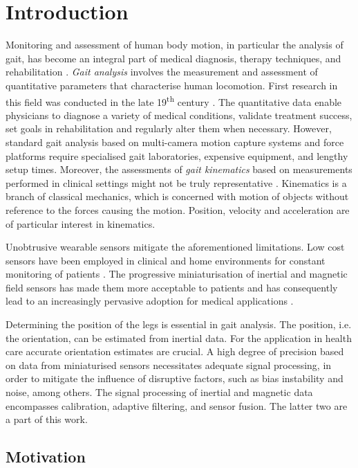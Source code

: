\chapter{Introduction}
\label{ch:Introduction}

Monitoring and assessment of human body motion, in particular the analysis of gait, has become an integral part of medical diagnosis, therapy techniques, and rehabilitation \cite{tao_gait_2012}. \emph{Gait analysis} involves the measurement and assessment of quantitative parameters that characterise human locomotion. First research in this field was conducted in the late 19\textsuperscript{th} century \cite{tao_gait_2012}. The quantitative data enable physicians to diagnose a variety of medical conditions, validate treatment success, set goals in rehabilitation and regularly alter them when necessary. However, standard gait analysis based on multi-camera motion capture systems and force platforms require specialised gait laboratories, expensive equipment, and lengthy setup times. Moreover, the assessments of \emph{gait kinematics} based on measurements performed in clinical settings might not be truly representative \cite{bonato_advances_2005}. Kinematics is a branch of classical mechanics, which is concerned with motion of objects without reference to the forces causing the motion. Position, velocity and acceleration are of particular interest in kinematics.

Unobtrusive wearable sensors mitigate the aforementioned limitations. Low cost sensors have been employed in clinical and home environments for constant monitoring of patients \cite{godfrey_direct_2008}. The progressive miniaturisation of inertial and magnetic field sensors has made them more acceptable to patients and has consequently lead to an increasingly pervasive adoption for medical applications \cite{wee_soon_ambulatory_2008}.

Determining the position of the legs is essential in gait analysis. The position, i.e. the orientation, can be estimated from inertial data. For the application in health care accurate orientation estimates are crucial. A high degree of precision based on data from miniaturised sensors necessitates adequate signal processing, in order to mitigate the influence of disruptive factors, such as bias instability and noise, among others. The signal processing of inertial and magnetic data encompasses calibration, adaptive filtering, and sensor fusion. The latter two are a part of this work.

\section{Motivation}

